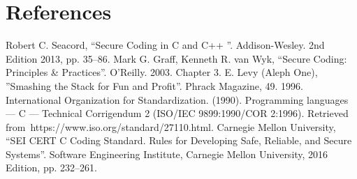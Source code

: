 \documentclass[review]{IEEEtran}
\begin{document}
\section{References}

\begin{thebibliography}{00}
 Robert C. Seacord, ``Secure Coding in C and C++ ''. Addison-Wesley. 2nd Edition 2013, pp. 35--86.
 Mark G. Graff, Kenneth R. van Wyk, ``Secure Coding: Principles & Practices''. O'Reilly. 2003. Chapter 3.
 E. Levy (Aleph One), ''Smashing the Stack for Fun and Profit''. Phrack Magazine, 49. 1996.
 International Organization for Standardization. (1990).
Programming languages — C — Technical Corrigendum 2 (ISO/IEC 9899:1990/COR 2:1996). Retrieved from https://www.iso.org/standard/27110.html.
 Carnegie Mellon University, ``SEI CERT C Coding Standard. Rules for Developing Safe, Reliable, and Secure Systems''. Software Engineering Institute, Carnegie Mellon University, 2016 Edition, pp. 232--261.

\end{thebibliography}
\vspace{12pt}
\end{document}
